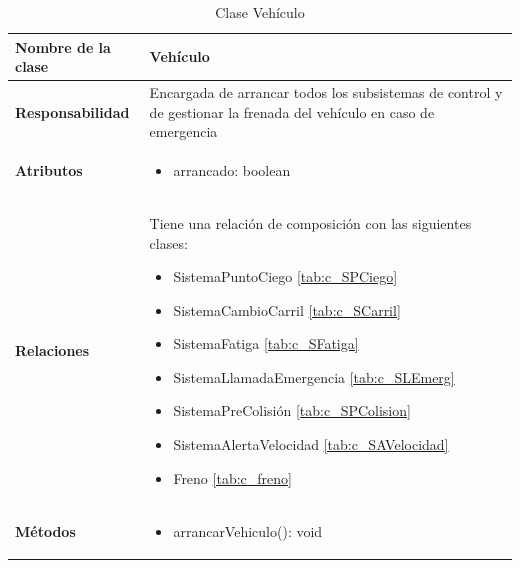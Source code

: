 \begin{table}[h]
\begin{center}
\begin{tabular}{p{} p{11cm}}
\textbf{Nombre de la clase} &  Vehículo\\ \hline \hline
\textbf{Responsabilidad} &  Encargada de arrancar todos los subsistemas de control y de gestionar la frenada del vehículo en caso de emergencia\\ \hline
\textbf{Atributos} &  \begin{itemize} \item arrancado: boolean \end{itemize}\\ \hline
\textbf{Relaciones} & Tiene una relación de composición con las siguientes clases:
                      \begin{itemize}
                        \item SistemaPuntoCiego \ref{tab:c_SPCiego}
                        \item SistemaCambioCarril \ref{tab:c_SCarril}
                        \item SistemaFatiga \ref{tab:c_SFatiga}
                        \item SistemaLlamadaEmergencia \ref{tab:c_SLEmerg}
                        \item SistemaPreColisión \ref{tab:c_SPColision}
                        \item SistemaAlertaVelocidad \ref{tab:c_SAVelocidad}
                        \item Freno \ref{tab:c_freno}
                      \end{itemize}\\ \hline
\textbf{Métodos} &  \begin{itemize}
                      \item arrancarVehiculo(): void
                    \end{itemize}\\ \hline
\end{tabular}
\caption{Clase Vehículo}
\label{tab:c_vehiculo}
\end{center}
\end{table}










